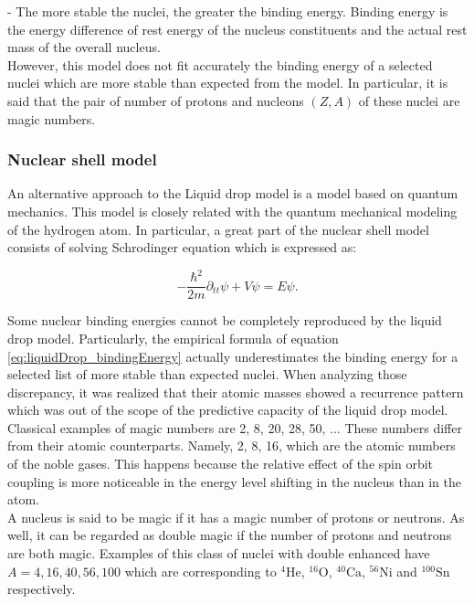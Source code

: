 \documentclass[openany]{book}
\begin{document}
-	The more stable the nuclei, the greater the binding energy.
Binding energy is the energy difference of rest energy of the nucleus constituents and the actual  rest mass of the overall nucleus. \\

However, this model does not fit accurately the binding energy of a selected nuclei which are more stable than expected from the model. In particular, it is said that the pair of number of protons and nucleons $(Z, A)$ of these nuclei are magic numbers. 

\subsubsection{Nuclear shell model}  \label{ssub:nuclearShellModel}

An alternative approach to the Liquid drop model is a model based on quantum mechanics. This model is closely related with the quantum mechanical modeling of the hydrogen atom. In particular, a great part of the nuclear shell model consists of solving Schrodinger equation which is expressed as:

\begin{equation} \label{eq:nuclearShell_schrodinger}
	- \frac{\hbar^2}{2m} \partial_{tt} \psi + V  \psi = E \psi.
\end{equation}

Some nuclear binding energies cannot be completely reproduced by the liquid drop model. Particularly, the empirical formula of equation \ref{eq:liquidDrop_bindingEnergy} actually underestimates the binding energy for a selected list of more stable than expected nuclei. When analyzing those discrepancy, it was realized that their atomic masses showed a recurrence pattern which was out of the scope of the predictive capacity of the liquid drop model.  \\

Classical examples of magic numbers are 2, 8, 20, 28, 50, ... These numbers differ from their atomic counterparts. Namely, 2, 8, 16, which are the atomic numbers of the noble gases. This happens because the relative effect of the spin orbit coupling is more noticeable in the energy level shifting in the nucleus than in the atom.\\


A nucleus is said to be magic if it has a magic number of protons or neutrons. As well, it can be regarded as double magic if the number of protons and neutrons are both magic. Examples of this class of nuclei with double enhanced have $A = 4, 16, 40, 56, 100$ which are corresponding to $\mathrm{{}^{4}He}$, $\mathrm{{}^{16}O}$,  $\mathrm{{}^{40}Ca}$, $\mathrm{{}^{56}Ni}$ and $\mathrm{{}^{100}Sn}$ respectively. \\
\end{document}
